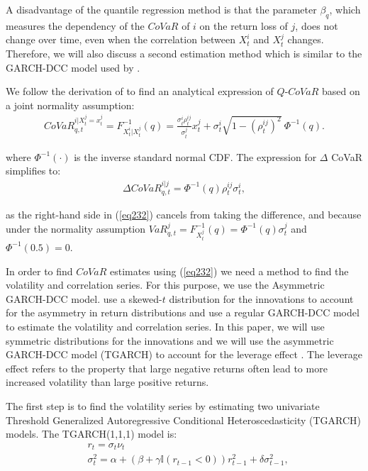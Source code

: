 \documentclass[12pt]{article}
\begin{document}
A disadvantage of the quantile regression method is that the parameter $\beta_q$, which measures the dependency of the $CoVaR$ of $i$ on the return loss of $j$, does not change over time, even when the correlation between $X^i_t$ and $X^j_t$ changes. Therefore, we will also discuss a second estimation method which is similar to the GARCH-DCC model used by \citet{girardi}.

We follow the derivation of \citet{adrian} to find an analytical expression of $Q$-$CoVaR$ based on a joint normality assumption:
\begin{align}
CoVaR^{i|X^j_t =x^j_t}_{q,t}=F^{-1}_{X^i_t|X^j_t}\left(q\right)=\frac{\sigma^i_t\rho^{ij}_t}{\sigma^j_t} x^j_t+ \sigma^i_t\sqrt{1-(\rho^{ij}_t)^2}\ \Phi^{-1}\left(q\right) .  \label{eq232}
\end{align}

\noindent where $\Phi^{-1}\left(\cdot\right)$ is the inverse standard normal CDF. The expression for $\Delta$ CoVaR simplifies to:
\begin{align}
\Delta CoVaR^{i|j}_{q,t}=\Phi^{-1}\left(q\right)\rho^{ij}_t \sigma^i_t  ,  \label{deltnm}
\end{align}

\noindent as the right-hand side in (\ref{eq232}) cancels from taking the difference, and because under the normality assumption $ VaR^{j}_{q,t}=F^{-1}_{X^j_t}\left(q\right)=\Phi^{-1}\left(q\right) \sigma^j_t $ and  $\Phi^{-1}\left(0.5\right)=0$.

In order to find $CoVaR$ estimates using (\ref{eq232}) we need a method to find the volatility and correlation series. For this purpose, we use the Asymmetric GARCH-DCC model. \citet{girardi} use a skewed-$t$ distribution \citep{hansen} for the innovations to account for the asymmetry in return distributions and use a regular GARCH-DCC model to estimate the volatility and correlation series. In this paper, we will use symmetric distributions for the innovations and we will use the asymmetric GARCH-DCC model (TGARCH) to account for the leverage effect \citep{gloston}. The leverage effect refers to the property that large negative returns often lead to more increased volatility than large positive returns.


The first step is to find the volatility series by estimating two univariate Threshold Generalized Autoregressive Conditional Heteroscedasticity (TGARCH) models. The TGARCH(1,1,1) model is:
\begin{align}
& r_t=\sigma_t\nu_t \label{sigmaeps} \\
& \sigma_t^2=\alpha + \left( \beta + \gamma \mathbb{I}\left(r_{t-1}<0\right) \right) r^2_{t-1} + \delta \sigma^2_{t-1} ,  \label{tgarcheq}
\end{align}
\end{document}
